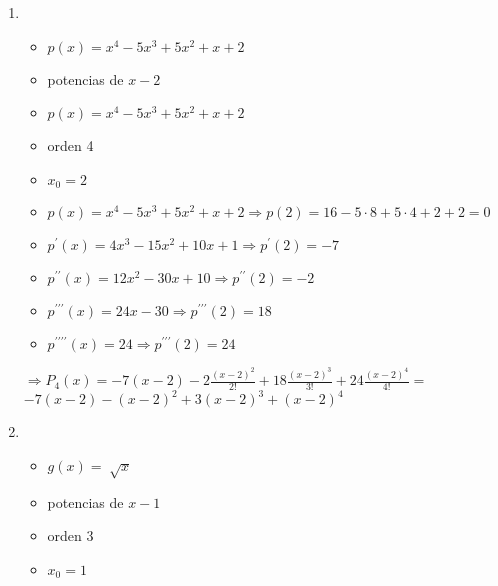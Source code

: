 \documentclass[../practica_05.tex]{subfiles}
\begin{document}
\begin{enumerate}
        \item

            \begin{itemize}
                \item $p(x) = x^4 - 5x^3 + 5x^2 + x + 2$
                \item potencias de $x-2$
            \end{itemize}

            \begin{itemize}
                \item $p(x) = x^4 - 5x^3 + 5x^2 + x + 2$
                \item orden 4
                \item $x_0 = 2$
            \end{itemize}

            \begin{itemize}
                \item $p(x) = x^4 - 5x^3 + 5x^2 + x + 2 \Rightarrow p(2) = 16 - 5\cdot 8 + 5\cdot 4 + 2 + 2 = 0$
                \item $p^\prime(x) = 4x^3 - 15x^2 + 10x + 1 \Rightarrow p^\prime(2) = -7 $
                \item $p^{\prime\prime}(x) = 12x^2 - 30x + 10 \Rightarrow p^{\prime\prime}(2) = -2$
                \item $p^{\prime\prime\prime}(x) = 24x - 30 \Rightarrow p^{\prime\prime\prime}(2) = 18$
                \item $p^{\prime\prime\prime\prime}(x) = 24 \Rightarrow p^{\prime\prime\prime}(2) = 24$
            \end{itemize}

            $\Rightarrow P_4(x) = -7(x-2) - 2\frac{(x-2)^2}{2!} + 18\frac{(x-2)^3}{3!} + 24\frac{(x-2)^4}{4!} = $
            $ -7(x-2) - (x-2)^2 + 3(x-2)^3 + (x-2)^4 $

        \item

            \begin{itemize}
                \item $g(x) = \sqrt[]{x}$
                \item potencias de $x-1$
                \item orden 3
                \item $x_0 = 1$
            \end{itemize}


\end{enumerate}
\end{document}
